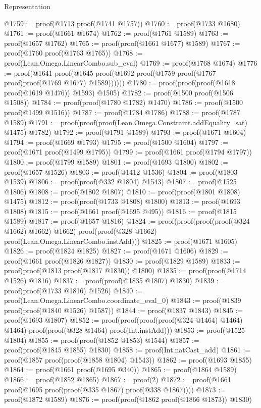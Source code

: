 \begin{lexlean}{Representation}
\begin{coremodule}
@1759 := proof(@1713 proof(@1741 @1757))
@1760 := proof(@1733 @1680)
@1761 := proof(@1661 @1674)
@1762 := proof(@1761 @1589)
@1763 := proof(@1657 @1762)
@1765 := proof(proof(@1661 @1677) @1589)
@1767 := proof(@1760 proof(@1763 @1765))
@1768 := proof(Lean.Omega.LinearCombo.sub_eval)
@1769 := proof(@1768 @1674)
@1776 := proof(@1641
      proof(@1645 proof(@1692 proof(@1759 proof(@1767 proof(proof(@1769 @1677) @1589))))))
@1780 := proof(proof(proof(@1618 proof(@1619 @1476)) @1593) @1505)
@1782 := proof(@1500 proof(@1506 @1508))
@1784 := proof(proof(@1780 @1782) @1470)
@1786 := proof(@1500 proof(@1499 @1516))
@1787 := proof(@1784 @1786)
@1788 := proof(@1787 @1589)
@1791 := proof(proof(proof(Lean.Omega.Constraint.addEquality_sat) @1475) @1782)
@1792 := proof(@1791 @1589)
@1793 := proof(@1671 @1604)
@1794 := proof(@1669 @1793)
@1795 := proof(@1500 @1604)
@1797 := proof(@1671 proof(@1499 @1795))
@1799 := proof(@1661 proof(@1794 @1797))
@1800 := proof(@1799 @1589)
@1801 := proof(@1693 @1800)
@1802 := proof(@1657 @1526)
@1803 := proof(@1412 @1536)
@1804 := proof(@1803 @1539)
@1806 := proof(proof(@332 @1804) @1543)
@1807 := proof(@1525 @1806)
@1808 := proof(@1802 @1807)
@1810 := proof(proof(@1801 @1808) @1475)
@1812 := proof(proof(@1733 @1808) @1800)
@1813 := proof(@1693 @1808)
@1815 := proof(@1661 proof(@1695 @495))
@1816 := proof(@1815 @1589)
@1817 := proof(@1657 @1816)
@1824 := proof(proof(proof(proof(@324 @1662) @1662) @1662)
      proof(proof(@328 @1662) proof(Lean.Omega.LinearCombo.instAdd)))
@1825 := proof(@1671 @1605)
@1826 := proof(@1824 @1825)
@1827 := proof(@1671 @1606)
@1829 := proof(@1661 proof(@1826 @1827))
@1830 := proof(@1829 @1589)
@1833 := proof(proof(@1813 proof(@1817 @1830)) @1800)
@1835 := proof(proof(@1714 @1526) @1816)
@1837 := proof(proof(@1835 @1807) @1830)
@1839 := proof(proof(@1733 @1816) @1526)
@1840 := proof(Lean.Omega.LinearCombo.coordinate_eval_0)
@1843 := proof(@1839 proof(proof(@1840 @1526) @1587))
@1844 := proof(@1837 @1843)
@1845 := proof(@1693 @1807)
@1852 := proof(proof(proof(proof(@324 @1464) @1464) @1464)
      proof(proof(@328 @1464) proof(Int.instAdd)))
@1853 := proof(@1525 @1804)
@1855 := proof(proof(@1852 @1853) @1544)
@1857 := proof(proof(@1845 @1855) @1830)
@1858 := proof(Int.natCast_add)
@1861 := proof(@1857 proof(proof(@1858 @1804) @1543))
@1862 := proof(@1693 @1855)
@1864 := proof(@1661 proof(@1695 @340))
@1865 := proof(@1864 @1589)
@1866 := proof(@1852 @1865)
@1867 := proof(2)
@1872 := proof(@1661 proof(@1695 proof(proof(@335 @1867) proof(@338 @1867))))
@1873 := proof(@1872 @1589)
@1876 := proof(proof(@1862 proof(@1866 @1873)) @1830)

\end{coremodule}
\end{lexlean}
